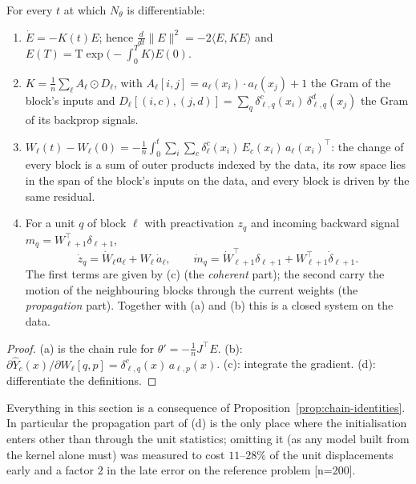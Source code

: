 \begin{proposition}
\label{prop:chain-identities}
For every $t$ at which $N_\theta$ is differentiable:
\begin{enumerate}
\item[(a)] $\dot E=-K(t)E$; hence $\tfrac{d}{dt}\|E\|^2=-2\langle E,KE\rangle$
and $E(T)=\mathrm{T}\!\exp\!\big(-\!\int_0^T K\big)E(0)$.
\item[(b)] $K=\frac1n\sum_\ell A_\ell\odot D_\ell$, with $A_\ell[i,j]=a_\ell(x_i)\!\cdot\!a_\ell(x_j)+1$
the Gram of the block's inputs and
$D_\ell[(i,c),(j,d)]=\sum_q\delta^c_{\ell,q}(x_i)\,\delta^d_{\ell,q}(x_j)$ the Gram
of its backprop signals.
\item[(c)] $W_\ell(t)-W_\ell(0)=-\frac1n\int_0^t\sum_i\sum_c\delta_\ell^c(x_i)\,E_c(x_i)\,a_\ell(x_i)^{\!\top}$:
the change of every block is a sum of outer products indexed by the data, its
row space lies in the span of the block's inputs on the data, and every block is
driven by the same residual.
\item[(d)] For a unit $q$ of block $\ell$ with preactivation $z_q$ and incoming
backward signal $m_q=W_{\ell+1}^{\!\top}\delta_{\ell+1}$,
\[
\dot z_q=\dot W_\ell a_\ell+W_\ell\,\dot a_\ell,\qquad
\dot m_q=\dot W_{\ell+1}^{\!\top}\delta_{\ell+1}+W_{\ell+1}^{\!\top}\dot\delta_{\ell+1}.
\]
The first terms are given by (c) (the \emph{coherent} part); the second carry
the motion of the neighbouring blocks through the current weights (the
\emph{propagation} part). Together with (a) and (b) this is a closed system on
the data.
\end{enumerate}
\end{proposition}
\begin{proof}
(a) is the chain rule for $\theta'=-\frac1nJ^{\!\top}E$. (b): $\partial\hat
Y_c(x)/\partial W_\ell[q,p]=\delta^c_{\ell,q}(x)\,a_{\ell,p}(x)$. (c): integrate
the gradient. (d): differentiate the definitions.
\end{proof}

\begin{remark}
Everything in this section is a consequence of
Proposition~\ref{prop:chain-identities}. In particular the propagation part of
(d) is the only place where the initialisation enters other than through the
unit statistics; omitting it (as any model built from the kernel alone must)
was measured to cost $11$--$28\%$ of the unit displacements early and a factor
$2$ in the late error on the reference problem [n=200].
\end{remark}

